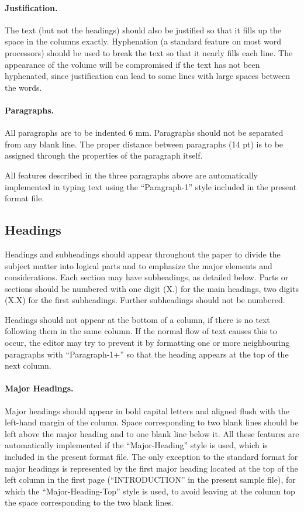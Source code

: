 \documentclass[bibtex,pagenumbers]{stabs2021}
\begin{document}
\paragraph{Justification.}

The text (but not the headings) should also be justified so that it
fills up the space in the columns exactly. Hyphenation (a standard
feature on most word processors) should be used to break the text so
that it nearly fills each line. The appearance of the volume will be
compromised if the text has not been hyphenated, since justification
can lead to some lines with large spaces between the words.

\paragraph{Paragraphs.}

All paragraphs are to be indented 6 mm. Paragraphs should not be
separated from any blank line. The proper distance between paragraphs
(14 pt) is to be assigned through the properties of the paragraph
itself.

All features described in the three paragraphs above are
automatically implemented in typing text using the ``Paragraph-1''
style included in the present format file.

\subsection{Headings}

Headings and subheadings should appear throughout the paper to divide
the subject matter into logical parts and to emphasize the major
elements and considerations. Each section may have subheadings, as
detailed below. Parts or sections should be numbered with one digit
(X.) for the main headings, two digits (X.X) for the first
subheadings. Further subheadings should not be numbered.

Headings should not appear at the bottom of a column, if there is no
text following them in the same column. If the normal flow of text
causes this to occur, the editor may try to prevent it by formatting
one or more neighbouring paragraphs with ``Paragraph-1+'' so that the
heading appears at the top of the next column.

\paragraph{Major Headings.}

Major headings should appear in bold capital letters and aligned flush
with the left-hand margin of the column. Space corresponding to two
blank lines should be left above the major heading and to one blank
line below it. All these features are automatically implemented if the
``Major-Heading'' style is used, which is included in the present
format file. The only exception to the standard format for major
headings is represented by the first major heading located at the top
of the left column in the first page (``INTRODUCTION'' in the present
sample file), for which the ``Major-Heading-Top'' style is used, to
avoid leaving at the column top the space corresponding to the two
blank lines.
\end{document}
